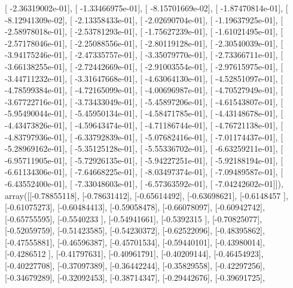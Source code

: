 \documentclass{article}
\begin{document}
       [ -2.36319002e-01],
       [ -1.33466975e-01],
       [ -8.15701669e-02],
       [ -1.87470814e-01],
       [ -8.12941309e-02],
       [ -2.13358433e-01],
       [ -2.02690704e-01],
       [ -1.19637925e-01],
       [ -2.58978018e-01],
       [ -2.53781293e-01],
       [ -1.75627239e-01],
       [ -1.61021495e-01],
       [ -2.57178046e-01],
       [ -2.25088556e-01],
       [ -2.80119128e-01],
       [ -2.30540039e-01],
       [ -3.94175246e-01],
       [ -2.47335757e-01],
       [ -3.35079770e-01],
       [ -2.73366711e-01],
       [ -3.66138255e-01],
       [ -2.72442669e-01],
       [ -2.91003554e-01],
       [ -2.97615975e-01],
       [ -3.44711232e-01],
       [ -3.31647668e-01],
       [ -4.63064130e-01],
       [ -4.52851097e-01],
       [ -4.78599384e-01],
       [ -4.72165099e-01],
       [ -4.00696987e-01],
       [ -4.70527949e-01],
       [ -3.67722716e-01],
       [ -3.73433049e-01],
       [ -5.45897206e-01],
       [ -4.61543807e-01],
       [ -5.95490044e-01],
       [ -5.45950134e-01],
       [ -4.58471785e-01],
       [ -4.43148678e-01],
       [ -4.43473826e-01],
       [ -4.59643474e-01],
       [ -4.71186744e-01],
       [ -4.76721138e-01],
       [ -4.83797936e-01],
       [ -6.33792839e-01],
       [ -5.07682416e-01],
       [ -7.01174437e-01],
       [ -5.28969162e-01],
       [ -5.35125128e-01],
       [ -5.55336702e-01],
       [ -6.63259211e-01],
       [ -6.95711905e-01],
       [ -5.72926135e-01],
       [ -5.94227251e-01],
       [ -5.92188194e-01],
       [ -6.61134306e-01],
       [ -7.64668225e-01],
       [ -8.03497374e-01],
       [ -7.09489587e-01],
       [ -6.43552400e-01],
       [ -7.33048603e-01],
       [ -6.57363592e-01],
       [ -7.04242602e-01]]), array([[-0.78855118],
       [-0.78631412],
       [-0.65614492],
       [-0.63698621],
       [-0.6148457 ],
       [-0.61075273],
       [-0.60484413],
       [-0.59058478],
       [-0.66078097],
       [-0.60942742],
       [-0.65755595],
       [-0.5540233 ],
       [-0.54941661],
       [-0.5392315 ],
       [-0.70825077],
       [-0.52059759],
       [-0.51423585],
       [-0.54230372],
       [-0.62522096],
       [-0.48395862],
       [-0.47555881],
       [-0.46596387],
       [-0.45701534],
       [-0.59440101],
       [-0.43980014],
       [-0.4286512 ],
       [-0.41797631],
       [-0.40961791],
       [-0.40209144],
       [-0.46454923],
       [-0.40227708],
       [-0.37097389],
       [-0.36442244],
       [-0.35829558],
       [-0.42297256],
       [-0.34679289],
       [-0.32092453],
       [-0.38714347],
       [-0.29442676],
       [-0.39691725],
\end{document}
